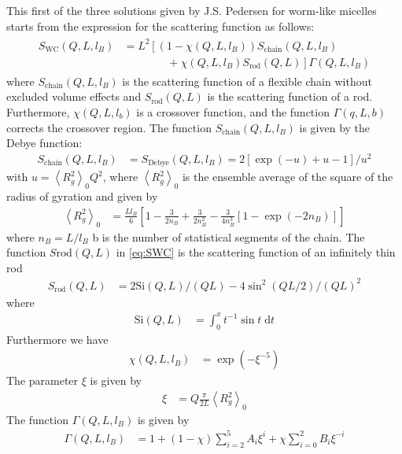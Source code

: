This first of the three solutions given by J.S. Pedersen \cite{Pedersen96Macrom} for
worm-like micelles starts from the expression for the scattering function as follows:
\begin{align}
\label{eq:SWC}
\begin{split}
S_\text{WC}(Q,L,l_B) &= L^2 \left[  \left(1-\chi(Q,L,l_B)\right)
            S_\text{chain}(Q,L,l_B) \right. \\
&  \left. \qquad  \qquad  +\chi(Q,L,l_B) S_\text{rod}(Q,L)    \right] \Gamma(Q,L,l_B)
\end{split}
\end{align}
where $S_\text{chain}(Q,L,l_B)$ is the scattering function of a flexible
chain without excluded volume effects and $S_\text{rod}(Q,L)$ is
the scattering function of a rod. Furthermore, $\chi(Q,L,l_b)$
is a crossover function, and the function $\Gamma(q,L,b)$ corrects
the crossover region.
The function $S_\text{chain}(Q,L,l_B)$ is given by the Debye function:
\begin{align}
\label{eq:SDebye}
S_\text{chain}(Q,L,l_B) &= S_\text{Debye}(Q,L,l_B) = 2\left[\exp(-u)+u-1\right]/u^2
\end{align}
with $u=\left\langle R_g^2\right\rangle_0 Q^2 $, where $\left\langle R_g^2\right\rangle_0$
is the ensemble average of the square of the radius of gyration and given by
\begin{align}
\left\langle R_g^2\right\rangle_0 &= \frac{Ll_B}{6}\left[1
        -\frac{3}{2n_B}
        +\frac{3}{2n_B^2}
        -\frac{3}{4n_B^3}
        \left[1-\exp(-2n_B)\right]\right]
\end{align}
where $n_B=L/l_B$ b is the number of statistical segments of the chain.
The function $S\text{rod}(Q,L)$ in \ref{eq:SWC} is the scattering function
of an infinitely thin rod
\begin{align}
S_\text{rod}(Q,L) &= 2 \text{Si}(Q,L)/(QL)-4\sin^2(QL/2)/(QL)^2
\end{align}
where
\begin{align}
\text{Si}(Q,L) &= \int_0^x t^{-1} \sin t \; \mathrm{d}t
\end{align}
Furthermore we have
\begin{align}
\chi(Q,L,l_B) &= \exp\left(-\xi^{-5}\right)
\end{align}
The parameter $\xi$ is given by
\begin{align}
\xi &= Q\frac{\pi}{2L} \left\langle R_g^2\right\rangle_0
\end{align}
The function $\Gamma(Q,L,l_B)$ is given by
\begin{align}
\Gamma(Q,L,l_B) &= 1+(1-\chi)\sum_{i=2}^5A_i\xi^i + \chi\sum_{i=0}^2B_i\xi^{-i}
\end{align}
